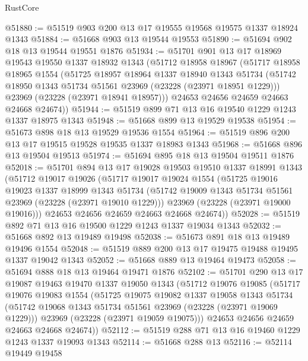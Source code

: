 \begin{lexlean}{RustCore}
\begin{coremodule}
@51880 := @51519 @903 @200 @13 @17 @19555 @19568 @19575 @1337 @18924 @1343
@51884 := @51668 @903 @13 @19544 @19553
@51890 := @51694 @902 @18 @13 @19544 @19551 @1876
@51934 := @51701
    @901
    @13
    @17
    @18969
    @19543
    @19550
    @1337
    @18932
    @1343
    (@51712
      @18958
      @18967
      (@51717
        @18958
        @18965
        @1554
        (@51725
          @18957
          @18964
          @1337
          @18940
          @1343
          @51734
          (@51742 @18950 @1343 @51734 @51561 @23969 (@23228 (@23971 @18951 @1229)))
          @23969
          (@23228 (@23971 @18941 @18957)))
        @24653
        @24656
        @24659
        @24663
        @24668
        @24674))
@51944 := @51519 @899 @71 @13 @16 @19540 @1229 @1243 @1337 @18975 @1343
@51948 := @51668 @899 @13 @19529 @19538
@51954 := @51673 @898 @18 @13 @19529 @19536 @1554
@51964 := @51519 @896 @200 @13 @17 @19515 @19528 @19535 @1337 @18983 @1343
@51968 := @51668 @896 @13 @19504 @19513
@51974 := @51694 @895 @18 @13 @19504 @19511 @1876
@52018 := @51701
    @894
    @13
    @17
    @19028
    @19503
    @19510
    @1337
    @18991
    @1343
    (@51712
      @19017
      @19026
      (@51717
        @19017
        @19024
        @1554
        (@51725
          @19016
          @19023
          @1337
          @18999
          @1343
          @51734
          (@51742 @19009 @1343 @51734 @51561 @23969 (@23228 (@23971 @19010 @1229)))
          @23969
          (@23228 (@23971 @19000 @19016)))
        @24653
        @24656
        @24659
        @24663
        @24668
        @24674))
@52028 := @51519 @892 @71 @13 @16 @19500 @1229 @1243 @1337 @19034 @1343
@52032 := @51668 @892 @13 @19489 @19498
@52038 := @51673 @891 @18 @13 @19489 @19496 @1554
@52048 := @51519 @889 @200 @13 @17 @19475 @19488 @19495 @1337 @19042 @1343
@52052 := @51668 @889 @13 @19464 @19473
@52058 := @51694 @888 @18 @13 @19464 @19471 @1876
@52102 := @51701
    @290
    @13
    @17
    @19087
    @19463
    @19470
    @1337
    @19050
    @1343
    (@51712
      @19076
      @19085
      (@51717
        @19076
        @19083
        @1554
        (@51725
          @19075
          @19082
          @1337
          @19058
          @1343
          @51734
          (@51742 @19068 @1343 @51734 @51561 @23969 (@23228 (@23971 @19069 @1229)))
          @23969
          (@23228 (@23971 @19059 @19075)))
        @24653
        @24656
        @24659
        @24663
        @24668
        @24674))
@52112 := @51519 @288 @71 @13 @16 @19460 @1229 @1243 @1337 @19093 @1343
@52114 := @51668 @288 @13
@52116 := @52114 @19449 @19458

\end{coremodule}
\end{lexlean}
